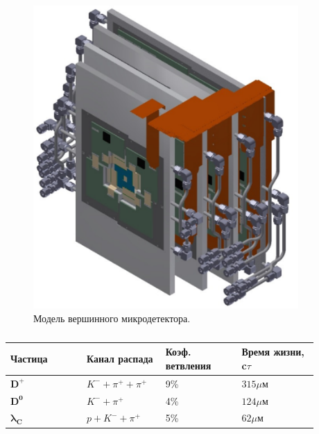\begin{minipage}[t]{0.495\textwidth}
\begin{figure}[H]
\includegraphics[width=0.9\textwidth]{pictures/MVD_1.png}
\caption{Модель вершинного микродетектора.}
\label{fig:MVD1}
\end{figure}
\end{minipage}

\begin{table}[H]
\caption{}
\label{tabl:MVDphys}
\begin{tabular}{ | p{0.22\linewidth} | p{0.22\linewidth} | p{0.22\linewidth} | p{0.22\linewidth} | }
\hline
\textbf{Частица} & \textbf{Канал} \newline \textbf{распада} & \textbf{Коэф.} \newline \textbf{ветвления} & \textbf{Время жизни, c$\tau$} \\
\hline
$\mathbf{D^{+}}$ & $K^{-} + \pi^{+} + \pi^{+}$ & 9\% & $315 \mu$м \\
\hline
$\mathbf{D^{0}}$ & $K^{-} + \pi^{+}$ & 4\% & $124 \mu$м \\
\hline
$\mathbf{\lambda_{C}}$ & $p + K^{-} + \pi^{+}$ & 5\% & $62 \mu$м \\
\hline
\end{tabular}
\end{table}

